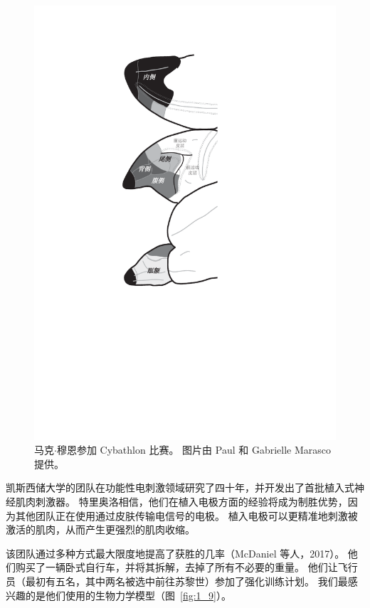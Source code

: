 \begin{figure}[!htb]
	\centering
	\includegraphics[width=0.6\linewidth]{chap1/1_8}
	\caption{马克$\cdot$穆恩参加 Cybathlon 比赛。
		图片由 Paul 和 Gabrielle Marasco 提供。 \label{fig:1_8}}
\end{figure}


凯斯西储大学的团队在功能性电刺激领域研究了四十年，并开发出了首批植入式神经肌肉刺激器。
特里奥洛相信，他们在植入电极方面的经验将成为制胜优势，因为其他团队正在使用通过皮肤传输电信号的电极。
植入电极可以更精准地刺激被激活的肌肉，从而产生更强烈的肌肉收缩。


该团队通过多种方式最大限度地提高了获胜的几率（McDaniel 等人，2017）。
他们购买了一辆卧式自行车，并将其拆解，去掉了所有不必要的重量。
他们让飞行员（最初有五名，其中两名被选中前往苏黎世）参加了强化训练计划。
我们最感兴趣的是他们使用的生物力学模型（图~\ref{fig:1_9}）。


